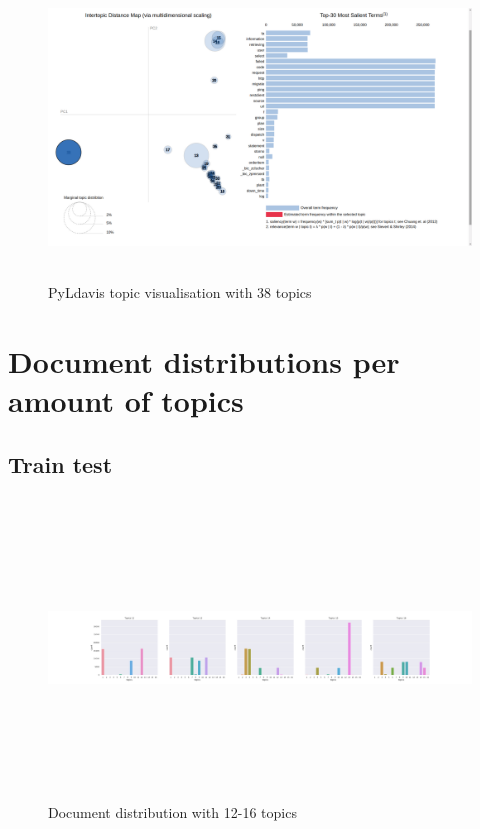  \begin{figure}[!h]
    \centering
    \includegraphics[width=15cm, height=8cm,trim=0 0 100px 0, clip=true]{figures/pyldavis/pyldavis_38.png}
    \caption{PyLdavis topic visualisation with 38 topics}
    \label{fig:pyldavis_38}
\end{figure}

\FloatBarrier
\section{Document distributions per amount of topics}\label{appendices:documentdistribution}

\subsection{Train test}
\begin{figure}[h]
    \centering
    \includegraphics[width=15cm, height=8cm]{figures/doc_distr/doc_distribution_12-16.png}
    \caption{Document distribution with 12-16 topics}
    \label{fig:Doc_distr_12-16corpus}
\end{figure}

